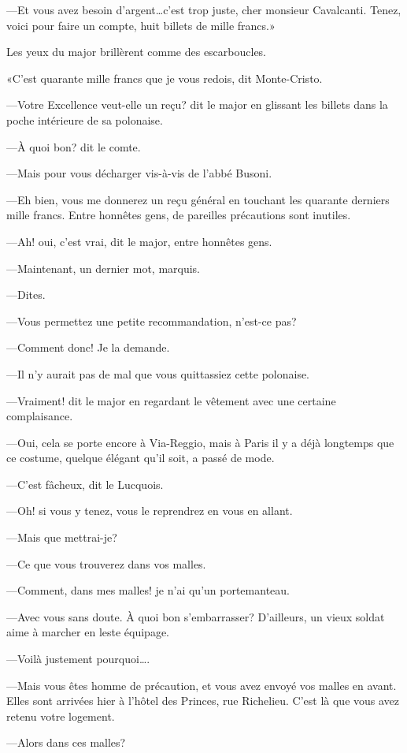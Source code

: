 —Et vous avez besoin d'argent\dots c'est trop juste, cher monsieur Cavalcanti. Tenez, voici pour faire un compte, huit billets de mille francs.» 

Les yeux du major brillèrent comme des escarboucles. 

«C'est quarante mille francs que je vous redois, dit Monte-Cristo. 

—Votre Excellence veut-elle un reçu? dit le major en glissant les billets dans la poche intérieure de sa polonaise. 

—À quoi bon? dit le comte. 

—Mais pour vous décharger vis-à-vis de l'abbé Busoni. 

—Eh bien, vous me donnerez un reçu général en touchant les quarante derniers mille francs. Entre honnêtes gens, de pareilles précautions sont inutiles. 

—Ah! oui, c'est vrai, dit le major, entre honnêtes gens. 

—Maintenant, un dernier mot, marquis. 

—Dites. 

—Vous permettez une petite recommandation, n'est-ce pas? 

—Comment donc! Je la demande. 

—Il n'y aurait pas de mal que vous quittassiez cette polonaise. 

—Vraiment! dit le major en regardant le vêtement avec une certaine complaisance. 

—Oui, cela se porte encore à Via-Reggio, mais à Paris il y a déjà longtemps que ce costume, quelque élégant qu'il soit, a passé de mode. 

—C'est fâcheux, dit le Lucquois. 

—Oh! si vous y tenez, vous le reprendrez en vous en allant. 

—Mais que mettrai-je? 

—Ce que vous trouverez dans vos malles. 

—Comment, dans mes malles! je n'ai qu'un portemanteau. 

—Avec vous sans doute. À quoi bon s'embarrasser? D'ailleurs, un vieux soldat aime à marcher en leste équipage. 

—Voilà justement pourquoi\dots. 

—Mais vous êtes homme de précaution, et vous avez envoyé vos malles en avant. Elles sont arrivées hier à l'hôtel des Princes, rue Richelieu. C'est là que vous avez retenu votre logement. 

—Alors dans ces malles? 


